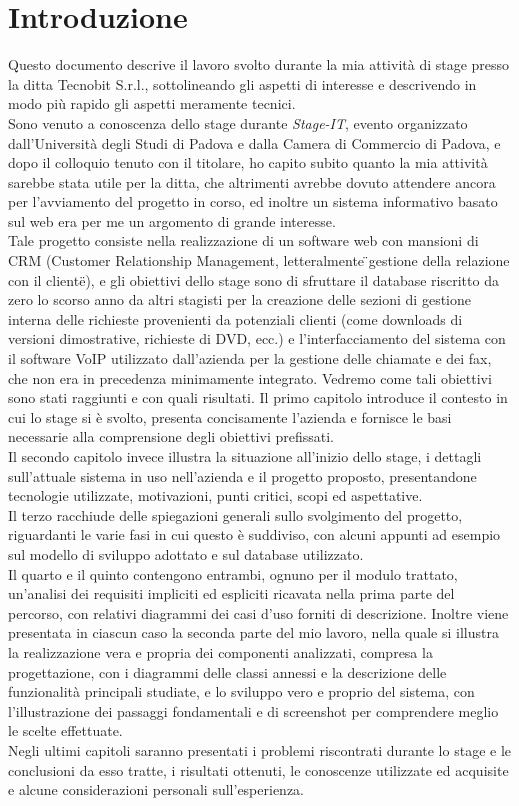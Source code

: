 \section{Introduzione}
Questo documento descrive il lavoro svolto durante la mia attivit\` a di stage presso la ditta Tecnobit S.r.l., sottolineando gli aspetti di interesse e descrivendo in modo pi\`u rapido gli aspetti meramente tecnici. \\
Sono venuto a conoscenza dello stage durante \textit{Stage-IT}, evento organizzato dall'Universit\` a degli Studi di Padova e dalla Camera di Commercio di Padova, e dopo il colloquio tenuto con il titolare, ho capito subito quanto la mia attivit\`a sarebbe stata utile per la ditta, che altrimenti avrebbe dovuto attendere ancora per l'avviamento del progetto in corso, ed inoltre un sistema informativo basato sul web era per me un argomento di grande interesse. \\
Tale progetto consiste nella realizzazione di un software web con mansioni di CRM (Customer Relationship Management, letteralmente \"{}gestione della relazione con il cliente\"{}), e gli obiettivi dello stage sono di sfruttare il database riscritto da zero lo scorso anno da altri stagisti per la creazione delle sezioni di gestione interna delle richieste provenienti da potenziali clienti (come downloads di versioni dimostrative, richieste di DVD, ecc.) e l'interfacciamento del sistema con il software VoIP utilizzato dall'azienda per la gestione delle chiamate e dei fax, che non era in precedenza minimamente integrato. Vedremo come tali obiettivi sono stati raggiunti e con quali risultati. 
Il primo capitolo introduce il contesto in cui lo stage si \` e svolto, presenta concisamente l'azienda e fornisce le basi necessarie alla comprensione degli obiettivi prefissati. \\
Il secondo capitolo invece illustra la situazione all'inizio dello stage, i dettagli sull'attuale sistema in uso nell'azienda e il progetto proposto, presentandone tecnologie utilizzate, motivazioni, punti critici, scopi ed aspettative.  \\
Il terzo racchiude delle spiegazioni generali sullo svolgimento del progetto, riguardanti le varie fasi in cui questo \`e suddiviso, con alcuni appunti ad esempio sul modello di sviluppo adottato e sul database utilizzato.\\
Il quarto e il quinto contengono entrambi, ognuno per il modulo trattato, un'analisi dei requisiti impliciti ed espliciti ricavata nella prima parte del percorso, con relativi diagrammi dei casi d'uso forniti di descrizione. Inoltre viene presentata in ciascun caso la seconda parte del mio lavoro, nella quale si illustra la realizzazione vera e propria dei componenti analizzati, compresa la progettazione, con i diagrammi delle classi annessi e la descrizione delle funzionalit\`a principali studiate, e lo sviluppo vero e proprio del sistema, con l'illustrazione dei passaggi fondamentali e di screenshot per comprendere meglio le scelte effettuate. \\
Negli ultimi capitoli saranno presentati i problemi riscontrati durante lo stage e le conclusioni da esso tratte, i risultati ottenuti, le conoscenze utilizzate ed acquisite e alcune considerazioni personali sull'esperienza.

